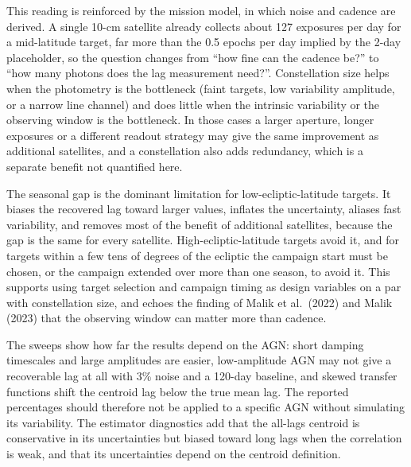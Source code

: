 \documentclass[11pt]{article}
\begin{document}
This reading is reinforced by the mission model, in which noise and cadence are derived. A single 10-cm satellite already collects about 127 exposures per day for a mid-latitude target, far more than the 0.5 epochs per day implied by the 2-day placeholder, so the question changes from ``how fine can the cadence be?'' to ``how many photons does the lag measurement need?''. Constellation size helps when the photometry is the bottleneck (faint targets, low variability amplitude, or a narrow line channel) and does little when the intrinsic variability or the observing window is the bottleneck. In those cases a larger aperture, longer exposures or a different readout strategy may give the same improvement as additional satellites, and a constellation also adds redundancy, which is a separate benefit not quantified here.

The seasonal gap is the dominant limitation for low-ecliptic-latitude targets. It biases the recovered lag toward larger values, inflates the uncertainty, aliases fast variability, and removes most of the benefit of additional satellites, because the gap is the same for every satellite. High-ecliptic-latitude targets avoid it, and for targets within a few tens of degrees of the ecliptic the campaign start must be chosen, or the campaign extended over more than one season, to avoid it. This supports using target selection and campaign timing as design variables on a par with constellation size, and echoes the finding of Malik et al.\ (2022) and Malik (2023) that the observing window can matter more than cadence.

The sweeps show how far the results depend on the AGN: short damping timescales and large amplitudes are easier, low-amplitude AGN may not give a recoverable lag at all with 3\% noise and a 120-day baseline, and skewed transfer functions shift the centroid lag below the true mean lag. The reported percentages should therefore not be applied to a specific AGN without simulating its variability. The estimator diagnostics add that the all-lags centroid is conservative in its uncertainties but biased toward long lags when the correlation is weak, and that its uncertainties depend on the centroid definition.
\end{document}
